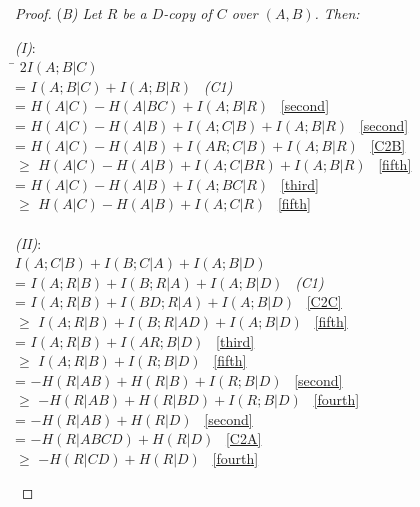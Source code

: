 \documentclass[10pt,journal]{IEEEtran}
\begin{document}
\begin{proof}(\em B)
Let $R$ be a $D$-copy of $C$ over $(A,B)$.  Then:


\begin{tabbing}
\emph{(I)}:\\
\hspace{.2in} \= $2I(A;B|C)$  \hspace{2in}   \=  \\
=           \> $I(A;B|C){+}I(A;B|R)$      \> \ \emph{(C1)} \\
=           \> $H(A|C){-}H(A|BC){+}I(A;B|R)$    \> \ \eqref{second}           \\
=           \> $H(A|C) {-}H(A|B) {+}I(A;C|B) {+}I(A;B|R)$   \> \ \eqref{second}   \\
=           \> $H(A|C) {-} H(A|B) {+}I(AR;C|B) {+}I(A;B|R)$     \> \ \eqref{C2B} \\
$\geq$      \> $H(A|C) {-}H(A|B) {+}I(A;C|BR) {+}I(A;B|R)$ \> \ \eqref{fifth}       \\
=           \> $H(A|C) {-}H(A|B) {+}I(A;BC|R)$    \> \ \eqref{third}            \\
$\geq$      \> $H(A|C) {-}H(A|B) {+}I(A;C|R)$    \> \ \eqref{fifth}             \\
\>\>\\
\emph{(II)}:\\
            \> $I(A;C|B){+}I(B;C|A){+}I(A;B|D)$               \\
=           \> $I(A;R|B){+}I(B;R|A){+}I(A;B|D)$              \> \ \emph{(C1)} \\
=           \> $I(A;R|B){+}I(BD;R|A){+}I(A;B|D)$               \> \ \eqref{C2C}   \\
$\geq$      \> $I(A;R|B){+}I(B;R|AD){+}I(A;B|D)$            \> \ \eqref{fifth}     \\
=           \> $I(A;R|B){+}I(AR;B|D)$            \> \ \eqref{third}       \\
$\geq$      \> $I(A;R|B){+}I(R;B|D)$             \> \ \eqref{fifth}  \\
=           \> ${-}H(R|AB){+}H(R|B){+}I(R;B|D)$     \> \ \eqref{second}          \\
$\geq$      \> ${-}H(R|AB){+}H(R|BD){+}I(R;B|D)$     \> \ \eqref{fourth}             \\
=           \> ${-}H(R|AB){+}H(R|D)$                       \> \ \eqref{second}     \\
=           \> ${-}H(R|ABCD){+}H(R|D)$                         \> \ \eqref{C2A}   \\
$\geq$      \> ${-}H(R|CD) {+}H(R|D)$                  \> \ \eqref{fourth}       \\

\end{tabbing}
\end{proof}
\end{document}
